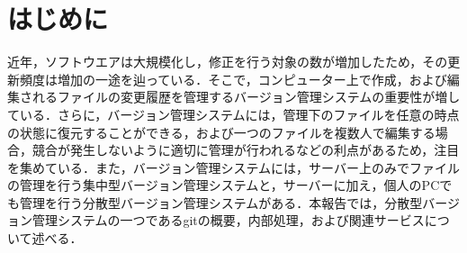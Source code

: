 \documentclass[a4paper,9pt,twocolumn]{jsarticle}
\begin{document}


\section{はじめに}
近年，ソフトウエアは大規模化し，修正を行う対象の数が増加したため，その更新頻度は増加の一途を辿っている．そこで，コンピューター上で作成，および編集されるファイルの変更履歴を管理するバージョン管理システムの重要性が増している．さらに，バージョン管理システムには，管理下のファイルを任意の時点の状態に復元することができる，および一つのファイルを複数人で編集する場合，競合が発生しないように適切に管理が行われるなどの利点があるため，注目を集めている．また，バージョン管理システムには，サーバー上のみでファイルの管理を行う集中型バージョン管理システムと，サーバーに加え，個人のPCでも管理を行う分散型バージョン管理システムがある．本報告では，分散型バージョン管理システムの一つであるgitの概要，内部処理，および関連サービスについて述べる．
\end{document}
